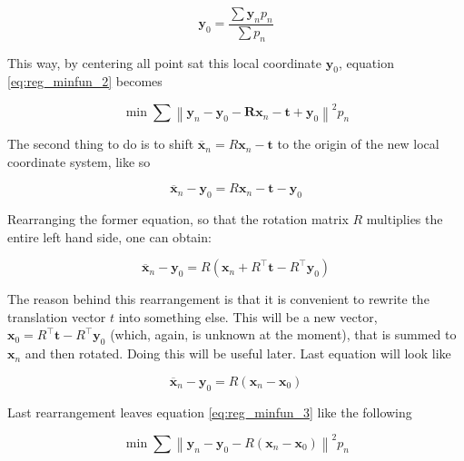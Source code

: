 \documentclass[../main.tex]{subfiles}
\begin{document}
\begin{equation}
    \boldsymbol{y}_{0}=\frac{\sum \boldsymbol{y}_{n} p_{n}}{\sum p_{n}}
\end{equation}

This way, by centering all point sat this local coordinate $\boldsymbol{y}_{0}$, equation \ref{eq:reg_minfun_2} becomes

\begin{equation} \label{eq:reg_minfun_3}
    \min \sum\left\|\boldsymbol{y}_{n}-\boldsymbol{y}_{0}-\boldsymbol{R} \boldsymbol{x}_{n}-\boldsymbol{t}+\boldsymbol{y}_{0}\right\|^{2} p_{n} 
\end{equation}

The second thing to do is to shift $\overline{\boldsymbol{x}}_{n} = R \boldsymbol{x}_{n}-\boldsymbol{t}$ to the origin of the new local coordinate system, like so

\begin{equation}
    \overline{\boldsymbol{x}}_{n}-\boldsymbol{y}_{0}=R \boldsymbol{x}_{n}-\boldsymbol{t} - \boldsymbol{y}_{0}
\end{equation}

Rearranging the former equation, so that the rotation matrix $R$ multiplies the entire left hand side, one can obtain:

\begin{equation} 
    \overline{\boldsymbol{x}}_{n}-\boldsymbol{y}_{0}=R\left(\boldsymbol{x}_{n}+R^{\top} \boldsymbol{t}-R^{\top} \boldsymbol{y}_{0}\right)
\end{equation}

The reason behind this rearrangement is that it is convenient to rewrite the translation vector $t$ into something else. This will be a new vector, $\boldsymbol{x}_{0}=R^{\top} \boldsymbol{t}-R^{\top} \boldsymbol{y}_{0}$ (which, again, is unknown at the moment), that is summed to $\boldsymbol{x}_{n}$ and then rotated. Doing this will be useful later. Last equation will look like

\begin{equation} 
    \overline{\boldsymbol{x}}_{n}-\boldsymbol{y}_{0}=R\left(\boldsymbol{x}_{n}-\boldsymbol{x}_{0}\right)
\end{equation}

Last rearrangement leaves equation \ref{eq:reg_minfun_3} like the following

\begin{equation}
    \min \sum\left\|\boldsymbol{y}_{n}-\boldsymbol{y}_{0}-R\left(\boldsymbol{x}_{n}-\boldsymbol{x}_{0}\right)\right\|^{2} p_{n}
\end{equation}
\end{document}
